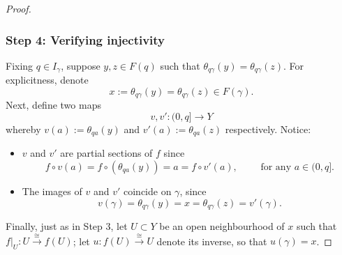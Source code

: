 \documentclass[a4paper, 11pt,reqno]{amsart}
\begin{document}
\begin{proof}
	\subsubsection*{Step 4: Verifying injectivity} Fixing $q\in I_{\gamma}$, suppose $y,z\in F(q)$ such that $\theta_{q\gamma}(y)=\theta_{q\gamma}(z)$. For explicitness, denote $$x:=\theta_{q\gamma}(y)=\theta_{q\gamma}(z) \in F(\gamma).$$
Next, define two maps $$v,v'\colon (0,q]\rightarrow Y$$ whereby $v(a):=\theta_{qa}(y)$ and $v'(a):=\theta_{qa}(z)$ respectively. Notice:
	\begin{itemize}
			\item $v$ and $v'$ are partial sections of $f$ since
		\[f\circ v(a) = f\circ(\theta_{qa}(y))=a = f\circ v'(a),\qquad \text{	for any $a\in(0,q]$.}\]
		
		\item The images of $v$ and $v'$ coincide on $\gamma$, since
		\[v(\gamma)=\theta_{q\gamma}(y)=x=\theta_{q\gamma}(z)=v'(\gamma).\]
	
	\end{itemize}
	Finally, just as in Step 3, let $U\subset Y$ be an open neighbourhood of $x$ such that $f|_U\colon U\xrightarrow{\cong}f(U)$; let $u\colon f(U)\xrightarrow{\cong}U$ denote its inverse, so that $u(\gamma)=x$. %
	
	

\end{proof}
\end{document}
